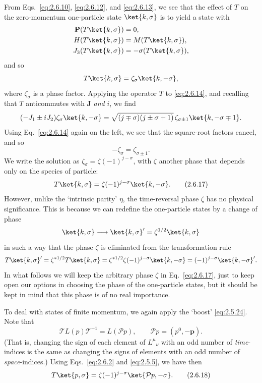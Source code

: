 From Eqs.~\eqref{eq:2.6.10}, \eqref{eq:2.6.12}, and \eqref{eq:2.6.13}, we see that the effect of $T$ on
the zero-momentum one-particle state $\ket{k,\sigma}$ is to yield a state with
\[
\begin{aligned}
\mathbf{P}(T\ket{k,\sigma})&=0,\\
H(T\ket{k,\sigma})&=M(T\ket{k,\sigma}),\\
J_3(T\ket{k,\sigma})&=-\sigma(T\ket{k,\sigma}),
\end{aligned}
\]
and so
\[
T\ket{k,\sigma}=\zeta_\sigma\ket{k,-\sigma},
\]
where $\zeta_\sigma$ is a phase factor. Applying the operator $T$ to
\eqref{eq:2.6.14}, and recalling that $T$ anticommutes with $\mathbf{J}$ \emph{and}
$i$, we find
\[
(-J_1\mathbin{\pm}iJ_2)\zeta_\sigma\ket{k,-\sigma}
=\sqrt{(j\mp\sigma)(j\pm\sigma+1)}\,
 \zeta_{\sigma\pm1}\ket{k,-\sigma\mp1}.
\]
Using Eq.~\eqref{eq:2.6.14} again on the left, we see that the square-root factors
cancel, and so
\[
-\zeta_\sigma=\zeta_{\sigma\pm1}.
\]
We write the solution as $\zeta_\sigma=\zeta(-1)^{j-\sigma}$, with $\zeta$
another phase that depends only on the species of particle:
\begin{equation}
T\ket{k,\sigma}=\zeta(-1)^{j-\sigma}\ket{k,-\sigma}.
\tag{2.6.17}\label{eq:2.6.17}
\end{equation}
However, unlike the `intrinsic parity' $\eta$, the time-reversal phase $\zeta$
has no physical significance. This is because we can redefine the
one-particle states by a change of phase
\[
\ket{k,\sigma}\longrightarrow
\ket{k,\sigma}'=\zeta^{1/2}\ket{k,\sigma}
\]
in such a way that the phase $\zeta$ is eliminated from the transformation
rule
\[
T\ket{k,\sigma}'
=\zeta^{*1/2}T\ket{k,\sigma}
=\zeta^{*1/2}\zeta(-1)^{j-\sigma}\ket{k,-\sigma}
=(-1)^{j-\sigma}\ket{k,-\sigma}'.
\]
In what follows we will keep the arbitrary phase $\zeta$ in Eq.~\eqref{eq:2.6.17},
just to keep open our options in choosing the phase of the one-particle states,
but it should be kept in mind that this phase is of no real importance.

To deal with states of finite momentum, we again apply the `boost' \eqref{eq:2.5.24}.
Note that
\[
\mathcal{T}L(p)\mathcal{T}^{-1}=L(\mathcal{P}p),
\qquad
\mathcal{P}p=(p^0,-\mathbf{p}).
\]
(That is, changing the sign of each element of $L^\mu{}_{\nu}$ with an odd
number of \emph{time}-indices is the same as changing the signs of elements
with an odd number of \emph{space}-indices.) Using Eqs.~\eqref{eq:2.6.2} and \eqref{eq:2.5.5},
we have then
\begin{equation}
T\ket{p,\sigma}
=\zeta(-1)^{j-\sigma}\ket{\mathcal{P}p,-\sigma}.
\tag{2.6.18}\label{eq:2.6.18}
\end{equation}


